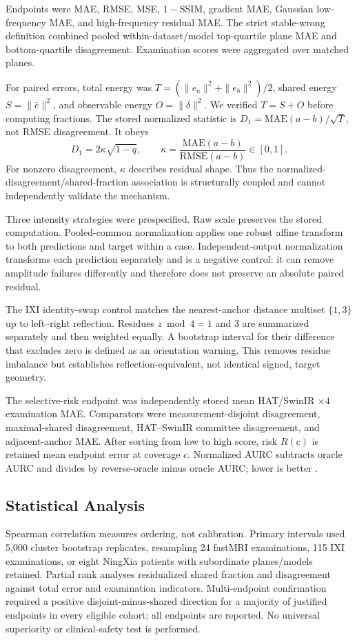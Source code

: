 \documentclass[journal,10pt]{IEEEtran}
\begin{document}
Endpoints were MAE, RMSE, MSE, $1-\mathrm{SSIM}$, gradient MAE, Gaussian low-frequency MAE, and high-frequency residual MAE. The strict stable-wrong definition combined pooled within-dataset/model top-quartile plane MAE and bottom-quartile disagreement. Examination scores were aggregated over matched planes.

For paired errors, total energy was $T=(\|e_a\|^2+\|e_b\|^2)/2$, shared energy $S=\|\bar e\|^2$, and observable energy $O=\|\delta\|^2$. We verified $T=S+O$ before computing fractions. The stored normalized statistic is $D_1=\mathrm{MAE}(a-b)/\sqrt{T}$, not RMSE disagreement. It obeys
\begin{equation}
D_1=2\kappa\sqrt{1-q},\qquad
\kappa=\frac{\mathrm{MAE}(a-b)}{\mathrm{RMSE}(a-b)}\in[0,1].
\label{eq:coupling}
\end{equation}
For nonzero disagreement, $\kappa$ describes residual shape. Thus the normalized-disagreement/shared-fraction association is structurally coupled and cannot independently validate the mechanism.

Three intensity strategies were prespecified. Raw scale preserves the stored computation. Pooled-common normalization applies one robust affine transform to both predictions and target within a case. Independent-output normalization transforms each prediction separately and is a negative control: it can remove amplitude failures differently and therefore does not preserve an absolute paired residual.

The IXI identity-swap control matches the nearest-anchor distance multiset $\{1,3\}$ up to left--right reflection. Residues $z\bmod4=1$ and 3 are summarized separately and then weighted equally. A bootstrap interval for their difference that excludes zero is defined as an orientation warning. This removes residue imbalance but establishes reflection-equivalent, not identical signed, target geometry.

The selective-risk endpoint was independently stored mean HAT/SwinIR $\times4$ examination MAE. Comparators were measurement-disjoint disagreement, maximal-shared disagreement, HAT--SwinIR committee disagreement, and adjacent-anchor MAE. After sorting from low to high score, risk $R(c)$ is retained mean endpoint error at coverage $c$. Normalized AURC subtracts oracle AURC and divides by reverse-oracle minus oracle AURC; lower is better \cite{ding2020selective}.

\subsection{Statistical Analysis}
Spearman correlation measures ordering, not calibration. Primary intervals used 5,000 cluster bootstrap replicates, resampling 24 fastMRI examinations, 115 IXI examinations, or eight NingXia patients with subordinate planes/models retained. Partial rank analyses residualized shared fraction and disagreement against total error and examination indicators. Multi-endpoint confirmation required a positive disjoint-minus-shared direction for a majority of justified endpoints in every eligible cohort; all endpoints are reported. No universal superiority or clinical-safety test is performed.
\end{document}
